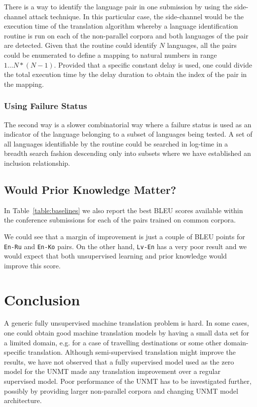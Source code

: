 \documentclass[]{article}
\begin{document}
There is a way to identify the language pair in one submission by using the side-channel attack technique.
In this particular case, the side-channel would be the execution time of the translation algorithm whereby a language identification routine is run on each of the non-parallel corpora and both languages of the pair are detected.
Given that the routine could identify $N$ languages, all the pairs could be enumerated to define a mapping to natural numbers in range $1\dots N*(N-1)$.
Provided that a specific constant delay is used, one could divide the total execution time by the delay duration to obtain the index of the pair in the mapping.

\subsubsection{Using Failure Status}

The second way is a slower combinatorial way where a failure status is used as an indicator of the language belonging to a subset of languages being tested.
A set of all languages identifiable by the routine could be searched in log-time in a breadth search fashion descending only into subsets where we have established an inclusion relationship.

\subsection{Would Prior Knowledge Matter?}
\label{sect:prior}

In Table~\ref{table:baselines} we also report the best BLEU scores available within the conference submissions for each of the pairs trained on common corpora.

We could see that a margin of improvement is just a couple of BLEU points for {\tt En-Ru} and {\tt En-Ko} pairs.
On the other hand, {\tt Lv-En} has a very poor result and we would expect that both unsupervised learning and prior knowledge would improve this score.


\section{Conclusion}

A generic fully unsupervised machine translation problem is hard.
In some cases, one could obtain good machine translation models by having a small data set for a limited domain, e.g. for a case of travelling destinations or some other domain-specific translation.
Although semi-supervised translation might improve the results, we have not observed that a fully supervised model used as the zero model for the UNMT made any translation improvement over a regular supervised model.
Poor performance of the UNMT has to be investigated further, possibly by providing larger non-parallel corpora and changing UNMT model architecture.
\end{document}
